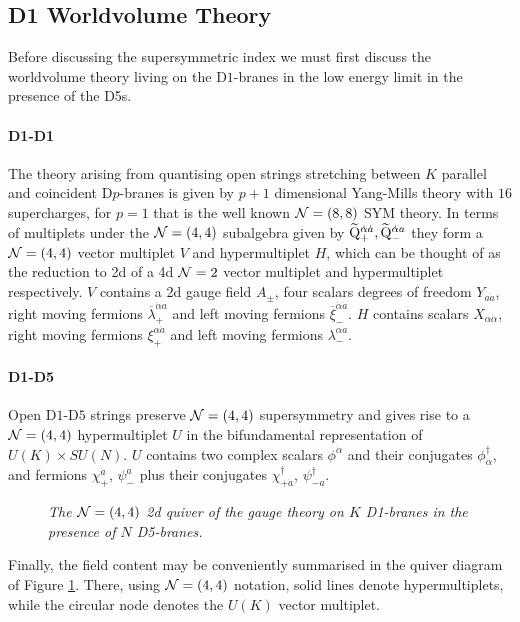 \documentclass[main.tex]{subfiles}
\begin{document}
\subsection{D1 Worldvolume Theory}
Before discussing the supersymmetric index we must first discuss the worldvolume theory living on the D$1$-branes in the low energy limit in the presence of the D5s.
\paragraph{D1-D1}
The theory arising from quantising open strings stretching between $K$ parallel and coincident D$p$-branes is given by $p+1$ dimensional Yang-Mills theory with $16$ supercharges, for $p=1$ that is the well known $\mathcal{N}=(8,8)$ SYM theory. In terms of multiplets under the $\mathcal{N}=(4,4)$ subalgebra given by $\widetilde{\mathrm{Q}}_{+}^{\dot\alpha \dot a},\widetilde{\mathrm{Q}}_{-}^{\dot\alpha a}$ they form a $\mathcal{N}=(4,4)$ vector multiplet $V$ and hypermultiplet $H$, which can be thought of as the reduction to 2d of a 4d $\mathcal{N}=2$ vector multiplet and hypermultiplet respectively. $V$ contains a 2d gauge field $A_{\pm}$, four scalars degrees of freedom $Y_{a\dot a}$, right moving fermions $\overline{\lambda}^{\dot\alpha a}_{+}$ and left moving fermions $\overline{\xi}_{-}^{\dot\alpha\dot a}$. $H$ contains scalars $X_{\alpha\dot\alpha}$, right moving fermions $\xi_{+}^{\alpha\dot a}$ and left moving fermions $\lambda^{\alpha a}_{-}$.

\paragraph{D1-D5}
Open D$1$-D$5$ strings preserve $\mathcal{N}=(4,4)$ supersymmetry and gives rise to a $\mathcal{N}=(4,4)$ hypermultiplet $U$ in the bifundamental representation of $U(K)\times SU(N)$. $U$ contains two complex scalars $\phi^{\dot\alpha}$ and their conjugates $\phi^{\dagger}_{\dot\alpha}$, and fermions $\chi^{\dot a}_{+}$, $\psi^{a}_{-}$ plus their conjugates $\chi^{\dagger}_{+\dot{a}}$, $\psi^{\dagger}_{-a}$.
\begin{figure}
\centering
{}
\caption{\it The $\mathcal{N}=(4,4)$ 2d quiver of the gauge theory on $K$ D1-branes in the presence of $N$ D5-branes.}
\label{fig:D1quiver}
\end{figure}
Finally, the field content may be conveniently summarised in the quiver diagram of Figure \ref{fig:D1quiver}. There, using $\mathcal{N}=(4,4)$ notation, solid lines denote hypermultiplets, while the circular node denotes the $U(K)$ vector multiplet.
\end{document}
